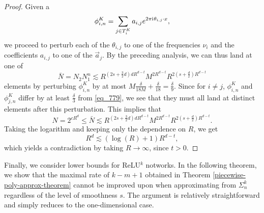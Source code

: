 \begin{proof}
 Given a
 \begin{equation}
 \phi^K_{i,n} = \sum_{j\in T^K_i} a_{i,j}e^{2\pi {\mathrm{i}\mkern1mu} \theta_{i,j}\cdot x},
 \end{equation}
 we proceed to perturb each of the $\theta_{i,j}$ to one of the frequencies $\nu_i$ and the coefficients $a_{i,j}$ to one of the $\vec{a}_j$. By the preceding analysis, we can thus land at one of
 \begin{equation}
  \bar{N} = N_2N_1^n \lesssim R^{(2s+\frac{3}{2}d)dR^{d-t}}M^{2R^{d-t}}R^{2(s+\frac{d}{2})R^{d-t}}
 \end{equation}
 elements by perturbing $\phi^K_{i,n}$ by at most $M\frac{\delta}{18M} + \frac{\delta}{18} = \frac{\delta}{9}$. Since for $i\neq j$, $\phi^K_{i,n}$ and $\phi^K_{j,n}$ differ by at least $\frac{\delta}{3}$ from \eqref{eq_779}, we see that they must all land at distinct elements after this perturbation. This implies that
 \begin{equation}
  N = 2^{cR^d}\leq \bar{N} \lesssim R^{(2s+\frac{3}{2}d)dR^{d-t}}M^{2R^{d-t}}R^{2(s+\frac{d}{2})R^{d-t}}.
 \end{equation}
 Taking the logarithm and keeping only the dependence on $R$, we get
 \begin{equation}
  R^d \lesssim (\log(R) + 1)R^{d-t},
 \end{equation}
 which yields a contradiction by taking $R\rightarrow \infty$, since $t > 0$.

\end{proof}

Finally, we consider lower bounds for ReLU$^k$ notworks. In the following theorem, we show that the maximal rate of $k-m+1$ obtained in Theorem \ref{piecewise-poly-approx-theorem} cannot be improved upon when approximating from $\Sigma^k_{n}$ regardless of the level of smoothness $s$. The argument is relatively straightforward and simply reduces to the one-dimensional case.


